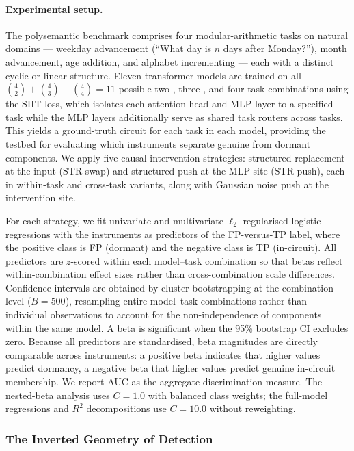 \paragraph{Experimental setup.}
The polysemantic benchmark comprises four modular-arithmetic tasks on natural domains --- weekday advancement (``What day is $n$ days after Monday?''), month advancement, age addition, and alphabet incrementing --- each with a distinct cyclic or linear structure. Eleven transformer models are trained on all $\binom{4}{2} + \binom{4}{3} + \binom{4}{4} = 11$ possible two-, three-, and four-task combinations using the SIIT loss, which isolates each attention head and MLP layer to a specified task while the MLP layers additionally serve as shared task routers across tasks. This yields a ground-truth circuit for each task in each model, providing the testbed for evaluating which instruments separate genuine from dormant components. We apply five causal intervention strategies: structured replacement at the input (STR swap) and structured push at the MLP site (STR push), each in within-task and cross-task variants, along with Gaussian noise push at the intervention site.

For each strategy, we fit univariate and multivariate $\ell_2$-regularised logistic regressions with the instruments as predictors of the FP-versus-TP label, where the positive class is FP (dormant) and the negative class is TP (in-circuit). All predictors are $z$-scored within each model--task combination so that betas reflect within-combination effect sizes rather than cross-combination scale differences. Confidence intervals are obtained by cluster bootstrapping at the combination level ($B = 500$), resampling entire model--task combinations rather than individual observations to account for the non-independence of components within the same model. A beta is significant when the 95\% bootstrap CI excludes zero. Because all predictors are standardised, beta magnitudes are directly comparable across instruments: a positive beta indicates that higher values predict dormancy, a negative beta that higher values predict genuine in-circuit membership. We report AUC as the aggregate discrimination measure. The nested-beta analysis uses $C = 1.0$ with balanced class weights; the full-model regressions and $R^{2}$ decompositions use $C = 10.0$ without reweighting.


\subsubsection{The Inverted Geometry of Detection}


